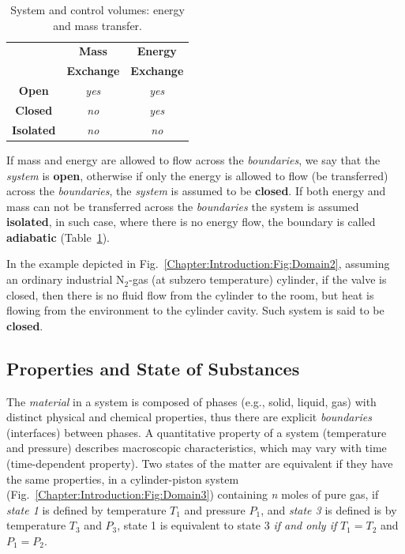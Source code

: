    \begin{table}[h]
     \begin{center}
      \begin{tabular}{|c|c|c|}
         \hline
                      & {\bf Mass} & {\bf Energy} \\
                      & {\bf Exchange} & {\bf Exchange} \\
         \hline
         {\bf Open}   & {\it yes}  & {\it yes}    \\
         {\bf Closed} & {\it no}   & {\it yes}    \\
         {\bf Isolated}&{\it no}   & {\it no}     \\
         \hline 
      \end{tabular}  
        \caption{System and control volumes: energy and mass transfer.}\label{Chapter:Introduction:Table:System}
     \end{center}
   \end{table}
   
   If mass and energy are allowed to flow across the {\it boundaries}, we say that the {\it system} is {\bf open}, otherwise if only the energy is allowed to flow (\ie be transferred) across the {\it boundaries}, the {\it system} is assumed to be {\bf closed}. If both energy and mass can not be transferred across the {\it boundaries} the system is assumed {\bf isolated}, in such case, where there is no energy flow, the boundary is called {\bf adiabatic} (Table~\ref{Chapter:Introduction:Table:System}).

   In the example depicted in Fig.~\ref{Chapter:Introduction:Fig:Domain2}, assuming an ordinary industrial N$_{2}$-gas (at subzero temperature) cylinder, if the valve is closed, then there is no fluid flow from the cylinder to the room, but heat is flowing from the environment to the cylinder cavity. Such system is said to be {\bf closed}.

   \subsection{Properties and State of Substances}\label{Chapter:Introduction:Section:Introduction:ExtensiveIntensiveProperties}
   The {\it material} in a system is composed of phases (e.g., solid, liquid, gas) with distinct physical and chemical properties, thus there are explicit {\it boundaries} (\ie interfaces) between phases. A quantitative property of a system (\eg temperature and pressure) describes macroscopic characteristics, which may vary with time (\ie time-dependent property). Two states of the matter are equivalent if they have the same properties, \eg in a cylinder-piston system (Fig.~\ref{Chapter:Introduction:Fig:Domain3}) containing {\it n} moles of pure gas, if {\it state 1} is defined by temperature $T_{1}$ and pressure $P_{1}$, and {\it state 3} is defined is by temperature $T_{3}$ and $P_{3}$, state 1 is equivalent to state 3 {\it if and only if} $T_{1} = T_{2}$ and $P_{1} = P_{2}$.

